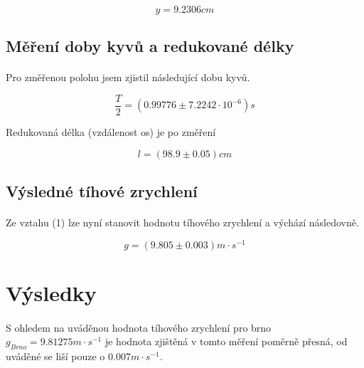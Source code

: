 \documentclass[a4paper,11pt]{article}
\begin{document}
        \begin{equation}
            y = 9.2306 cm
        \end{equation}

    \subsection{Měření doby kyvů a redukované délky}

        \paragraph{} Pro změřenou polohu jsem zjistil následující dobu kyvů.

        \begin{equation}
            \frac{T}{2} = (0.99776 \pm 7.2242 \cdot 10^{-6}) s
        \end{equation}

        Redukovaná délka (vzdálenost os) je po změření 

        \begin{equation}
            l = (98.9 \pm 0.05) cm
        \end{equation}

    \subsection{Výsledné tíhové zrychlení}

        \paragraph{} Ze vztahu (1) lze nyní stanovit hodnotu tíhového zrychlení
        a výchází následovně.

        \begin{equation}
            g = (9.805 \pm 0.003) m \cdot s^{-1}
        \end{equation}

        \paragraph{} 

\section{Výsledky}

    \paragraph{} S ohledem na uváděnou hodnota tíhového zrychlení pro brno
    $g_{Brno} = 9.81275 m \cdot s^{-1}$ je hodnota zjištěná v tomto měření
    poměrně přesná, od uváděné se liší pouze o $0.007 m \cdot s^{-1}$.
\end{document}
